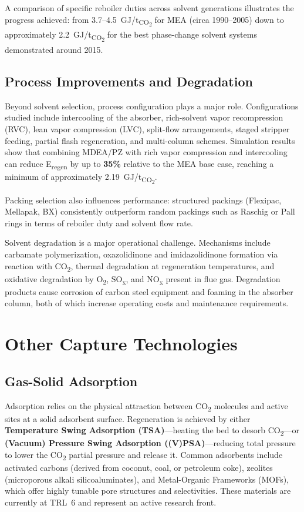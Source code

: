 A comparison of specific reboiler duties across solvent generations illustrates the 
progress achieved: from 3.7--4.5~GJ/t\textsubscript{CO\textsubscript{2}} for MEA 
(circa 1990--2005) down to approximately 2.2~GJ/t\textsubscript{CO\textsubscript{2}} 
for the best phase-change solvent systems demonstrated around 2015.

\subsection{Process Improvements and Degradation}

Beyond solvent selection, process configuration plays a major role. Configurations 
studied include intercooling of the absorber, rich-solvent vapor recompression (RVC), 
lean vapor compression (LVC), split-flow arrangements, staged stripper feeding, 
partial flash regeneration, and multi-column schemes. Simulation results show that 
combining MDEA/PZ with rich vapor compression and intercooling can reduce 
E\textsubscript{regen} by up to \textbf{35\%} relative to the MEA base case, reaching 
a minimum of approximately 2.19~GJ/t\textsubscript{CO\textsubscript{2}}.

Packing selection also influences performance: structured packings (Flexipac, Mellapak, 
BX) consistently outperform random packings such as Raschig or Pall rings in terms of 
reboiler duty and solvent flow rate.

Solvent degradation is a major operational challenge. Mechanisms include carbamate 
polymerization, oxazolidinone and imidazolidinone formation via reaction with 
CO\textsubscript{2}, thermal degradation at regeneration temperatures, and oxidative 
degradation by O\textsubscript{2}, SO\textsubscript{x}, and NO\textsubscript{x} 
present in flue gas. Degradation products cause corrosion of carbon steel equipment 
and foaming in the absorber column, both of which increase operating costs and 
maintenance requirements.

\section{Other Capture Technologies}

\subsection{Gas-Solid Adsorption}

Adsorption relies on the physical attraction between CO\textsubscript{2} molecules and 
active sites at a solid adsorbent surface. Regeneration is achieved by either 
\textbf{Temperature Swing Adsorption (TSA)}---heating the bed to desorb 
CO\textsubscript{2}---or \textbf{(Vacuum) Pressure Swing Adsorption ((V)PSA)}---reducing 
total pressure to lower the CO\textsubscript{2} partial pressure and release it. Common 
adsorbents include activated carbons (derived from coconut, coal, or petroleum coke), 
zeolites (microporous alkali silicoaluminates), and Metal-Organic Frameworks (MOFs), 
which offer highly tunable pore structures and selectivities. These materials are 
currently at TRL~6 and represent an active research front.

